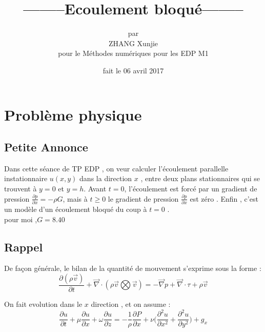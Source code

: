\documentclass[a4paper,10pt]{report} %
\title{--------\textbf{Ecoulement bloqué}--------} %
\author{par\\ZHANG Xunjie\\pour le Méthodes numériques pour les EDP M1 } %
\date{fait le 06 avril 2017} %
\begin{document}
\maketitle %
\tableofcontents %
\listoffigures %






\chapter{Problème physique} %

\section{Petite Annonce}
Dans cette séance de TP EDP , on veur calculer l'écoulement parallelle instationnaire $u(x,y)$ dans la direction $x$ , entre deux plans stationnaires qui se trouvent à $y=0$ et $y=h$. Avant $t=0$, l'écoulement est forcé par un gradient de pression $\frac{\partial p}{\partial x}=-\rho G$, mais à $t \geq0$ le gradient de pression $\frac{\partial p}{\partial x}$ est zéro . Enfin , c'est un modèle d'un écoulement bloqué du coup à $t=0$ .\\

pour moi ,$G=8.40$ \\

\section{Rappel}
De façon générale, le bilan de la quantité de mouvement s'exprime sous la forme :
\begin{equation}
\frac{\partial(\rho\overrightarrow{v})}{\partial t}+\overrightarrow{\nabla}\cdot(\rho\overrightarrow{v}\bigotimes\overrightarrow{v})=-\overrightarrow{\nabla}p+\overrightarrow{\nabla}\cdot\tau+\rho\overrightarrow{v}
\end{equation}


 On fait evolution dans le $x$ direction , et on assume :
 \begin{equation}
 \frac{\partial u}{\partial t}+\mu\frac{\partial u}{\partial x}+\omega\frac{\partial u}{\partial z}=-\frac{1}{\rho}\frac{\partial P}{\partial x}+\nu\Big(\frac{\partial^2 u}{\partial x^2}+\frac{\partial^2 u}{\partial y^2}\Big)+g_x
 \end{equation}
 
\end{document}

